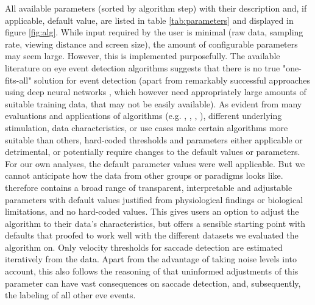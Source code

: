 All available parameters (sorted by algorithm step) with their description and, if applicable, default value, are listed in table \ref{tab:parameters} and displayed in figure \ref{fig:alg}. While input required by the user is minimal (raw data, sampling rate, viewing distance and screen size), the amount of configurable parameters may seem large. However, this is implemented purposefully.
The available literature on eye event detection algorithms suggests that there is no true "one-fits-all" solution for event detection (apart from remarkably successful approaches using deep neural networks \citep{Startsev2018}, which however need appropriately large amounts of suitable training data, that may not be easily available). As evident from many evaluations and applications of algorithms (e.g. \cite{Andersson2017}, \cite{Larsson2013}, \cite{Zemblys2018}, \cite{5523936}), different underlying stimulation, data characteristics, or use cases make certain algorithms more suitable than others, hard-coded thresholds and parameters either applicable or detrimental, or potentially require changes to the default values or parameters. For our own analyses, the default parameter values were well applicable. But we cannot anticipate how the data from other groups or paradigms looks like. \remodnav therefore contains a broad range of transparent, interpretable and adjustable parameters with default values justified from physiological findings or biological limitations, and no hard-coded values. This gives users an option to adjust the algorithm to their data's characteristics, but offers a sensible starting point with defaults that proofed to work well with the different datasets we evaluated the algorithm on. Only velocity thresholds for saccade detection are estimated iteratively from the data. Apart from the advantage of taking noise levels into account, this also follows the reasoning of \cite{Nystrom2010AnData} that uninformed adjustments of this parameter can have vast consequences on saccade detection, and, subsequently, the labeling of all other eve events.

